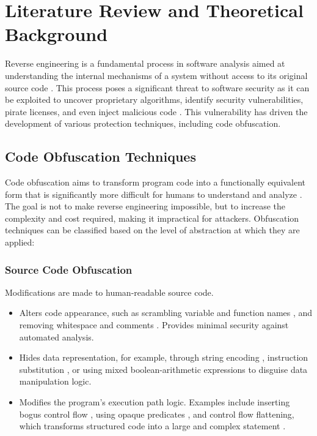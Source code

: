 \section{Literature Review and Theoretical Background} %

Reverse engineering is a fundamental process in software analysis aimed at understanding the internal mechanisms of a system without access to its original source code \cite{Has18, gee24}. This process poses a significant threat to software security as it can be exploited to uncover proprietary algorithms, identify security vulnerabilities, pirate licenses, and even inject malicious code \cite{Wak24}. This vulnerability has driven the development of various protection techniques, including code obfuscation.

\subsection{Code Obfuscation Techniques}
Code obfuscation aims to transform program code into a functionally equivalent form that is significantly more difficult for humans to understand and analyze \cite{Jin24}. The goal is not to make reverse engineering impossible, but to increase the complexity and cost required, making it impractical for attackers. Obfuscation techniques can be classified based on the level of abstraction at which they are applied:

\subsubsection{Source Code Obfuscation}
Modifications are made to human-readable source code.
\begin{itemize}
    \item {} Alters code appearance, such as scrambling variable and function names \cite{Cha04}, and removing whitespace and comments \cite{Bal11}. Provides minimal security against automated analysis.
    \item {} Hides data representation, for example, through string encoding \cite{Ert05, Fuk08, Kov13}, instruction substitution \cite{LeD12, Dar10}, or using mixed boolean-arithmetic expressions \cite{Liu21, Sch22, Zho07} to disguise data manipulation logic.
    \item {} Modifies the program's execution path logic. Examples include inserting bogus control flow \cite{LiY211}, using opaque predicates \cite{XuD16}, and control flow flattening, which transforms structured code into a large and complex  statement \cite{Lás09}.
\end{itemize}

